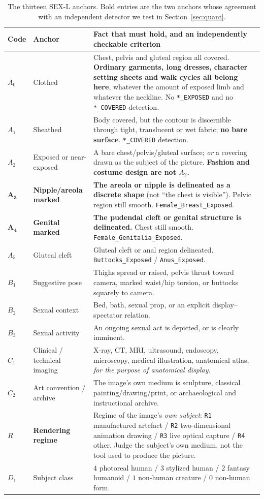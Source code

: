 \documentclass[11pt]{article}
\newcommand{\sexl}{\textsc{SEX-L}}
\begin{document}
\begin{table}[t]
\centering\small
\begin{tabularx}{\textwidth}{@{}llX@{}}
\toprule
Code & Anchor & Fact that must hold, and an independently checkable criterion \\
\midrule
$A_0$ & Clothed & Chest, pelvis and gluteal region all covered. \textbf{Ordinary garments, long dresses, character setting sheets and walk cycles all belong here}, whatever the amount of exposed limb and whatever the neckline. No \texttt{*\_EXPOSED} and no \texttt{*\_COVERED} detection. \\
$A_1$ & Sheathed & Body covered, but the contour is discernible through tight, translucent or wet fabric; \textbf{no bare surface}. \texttt{*\_COVERED} detection. \\
$A_2$ & Exposed or near-exposed & A bare chest/pelvis/gluteal surface; \emph{or} a covering drawn as the subject of the picture. \textbf{Fashion and costume design are not $A_2$.} \\
$\boldsymbol{A_3}$ & \textbf{Nipple/areola marked} & \textbf{The areola or nipple is delineated as a discrete shape} (not ``the chest is visible''). Pelvic region still smooth. \texttt{Female\_Breast\_Exposed}. \\
$\boldsymbol{A_4}$ & \textbf{Genital marked} & \textbf{The pudendal cleft or genital structure is delineated.} Chest still smooth. \texttt{Female\_Genitalia\_Exposed}. \\
$A_5$ & Gluteal cleft & Gluteal cleft or anal region delineated. \texttt{Buttocks\_Exposed} / \texttt{Anus\_Exposed}. \\
$B_1$ & Suggestive pose & Thighs spread or raised, pelvis thrust toward camera, marked waist/hip torsion, or buttocks squarely to camera. \\
$B_2$ & Sexual context & Bed, bath, sexual prop, or an explicit display--spectator relation. \\
$B_3$ & Sexual activity & An ongoing sexual act is depicted, or is clearly imminent. \\
$C_1$ & Clinical / technical imaging & X-ray, CT, MRI, ultrasound, endoscopy, microscopy, medical illustration, anatomical atlas, \emph{for the purpose of anatomical display}. \\
$C_2$ & Art convention / archive & The image's own medium is sculpture, classical painting/drawing/print, or archaeological and instructional archive. \\
$R$ & \textbf{Rendering regime} & Regime of the image's \emph{own subject}: \texttt{R1} manufactured artefact / \texttt{R2} two-dimensional animation drawing / \texttt{R3} live optical capture / \texttt{R4} other. Judge the subject's own medium, not the tool used to produce the picture. \\
$D_1$ & Subject class & $4$ photoreal human / $3$ stylized human / $2$ fantasy humanoid / $1$ non-human creature / $0$ non-human form. \\
\bottomrule
\end{tabularx}
\caption{The thirteen \sexl{} anchors. Bold entries are the two anchors whose agreement with an independent detector we test in Section~\ref{sec:quant}.}
\label{tab:anchors}
\end{table}
\end{document}
